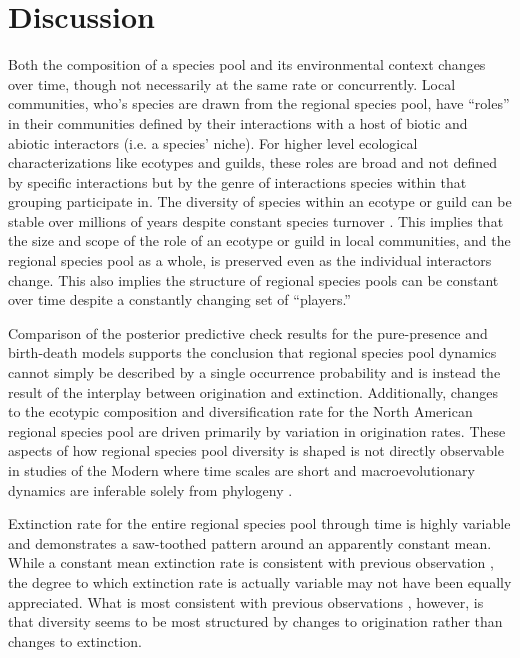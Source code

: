 \documentclass[12pt,letterpaper]{article}
\begin{document}
\section*{Discussion}

Both the composition of a species pool and its environmental context changes over time, though not necessarily at the same rate or concurrently. Local communities, who's species are drawn from the regional species pool, have ``roles'' in their communities defined by their interactions with a host of biotic and abiotic interactors (i.e. a species' niche). For higher level ecological characterizations like ecotypes and guilds, these roles are broad and not defined by specific interactions but by the genre of interactions species within that grouping participate in. The diversity of species within an ecotype or guild can be stable over millions of years despite constant species turnover \citep{Jernvall2004,Slater2015c,Valkenburgh1999}. This implies that the size and scope of the role of an ecotype or guild in local communities, and the regional species pool as a whole, is preserved even as the individual interactors change. This also implies the structure of regional species pools can be constant over time despite a constantly changing set of ``players.''

Comparison of the posterior predictive check results for the pure-presence and birth-death models supports the conclusion that regional species pool dynamics cannot simply be described by a single occurrence probability and is instead the result of the interplay between origination and extinction. Additionally, changes to the ecotypic composition and diversification rate for the North American regional species pool are driven primarily by variation in origination rates. These aspects of how regional species pool diversity is shaped is not directly observable in studies of the Modern where time scales are short and macroevolutionary dynamics are inferable solely from phylogeny \citep{Fritz2013a}.

Extinction rate for the entire regional species pool through time is highly variable and demonstrates a saw-toothed pattern around an apparently constant mean. While a constant mean extinction rate is consistent with previous observation \citep{Alroy1996a,Alroy2000g}, the degree to which extinction rate is actually variable may not have been equally appreciated. What is most consistent with previous observations \citep{Alroy1996a,Alroy2000g}, however, is that diversity seems to be most structured by changes to origination rather than changes to extinction.
\end{document}
